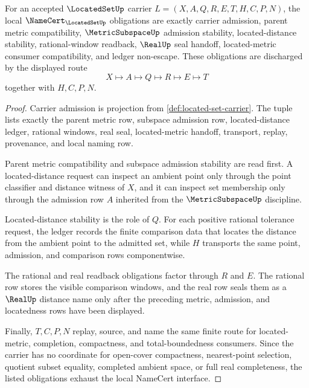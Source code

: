 \begin{theorem}
\label{thm:located-set-namecert-obligations}
For an accepted $\LocatedSetUp$ carrier $L=(X,A,Q,R,E,T,H,C,P,N)$, the local $\NameCert_{\LocatedSetUp}$ obligations are exactly carrier admission, parent metric compatibility, $\MetricSubspaceUp$ admission stability, located-distance stability, rational-window readback, $\RealUp$ seal handoff, located-metric consumer compatibility, and ledger non-escape. These obligations are discharged by the displayed route
$$
X\longmapsto A\longmapsto Q\longmapsto R\longmapsto E\longmapsto T
$$
together with $H,C,P,N$.
\end{theorem}
\begin{proof}
Carrier admission is projection from \autoref{def:located-set-carrier}. The tuple lists exactly the parent metric row, subspace admission row, located-distance ledger, rational windows, real seal, located-metric handoff, transport, replay, provenance, and local naming row.

Parent metric compatibility and subspace admission stability are read first. A located-distance request can inspect an ambient point only through the point classifier and distance witness of $X$, and it can inspect set membership only through the admission row $A$ inherited from the $\MetricSubspaceUp$ discipline.

Located-distance stability is the role of $Q$. For each positive rational tolerance request, the ledger records the finite comparison data that locates the distance from the ambient point to the admitted set, while $H$ transports the same point, admission, and comparison rows componentwise.

The rational and real readback obligations factor through $R$ and $E$. The rational row stores the visible comparison windows, and the real row seals them as a $\RealUp$ distance name only after the preceding metric, admission, and locatedness rows have been displayed.

Finally, $T,C,P,N$ replay, source, and name the same finite route for located-metric, completion, compactness, and total-boundedness consumers. Since the carrier has no coordinate for open-cover compactness, nearest-point selection, quotient subset equality, completed ambient space, or full real completeness, the listed obligations exhaust the local NameCert interface.
\end{proof}

